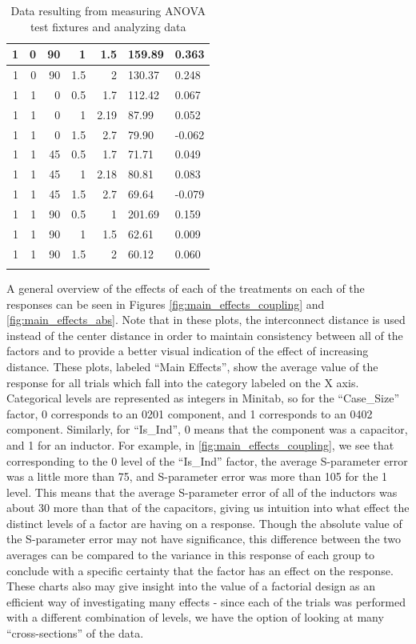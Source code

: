 \documentclass[12pt]{usfcoe}
\begin{document}
\begin{table}
\begin{tabular}{|r|r|r|r|r|l|l|}
        \hline
        1&0&90&1&1.5&159.89&0.363 \\
        \hline
        1&0&90&1.5&2&130.37&0.248 \\
        \hline
        1&1&0&0.5&1.7&112.42&0.067 \\
        \hline
        1&1&0&1&2.19&87.99&0.052 \\
        \hline
        1&1&0&1.5&2.7&79.90&-0.062 \\
        \hline
        1&1&45&0.5&1.7&71.71&0.049 \\
        \hline
        1&1&45&1&2.18&80.81&0.083 \\
        \hline
        1&1&45&1.5&2.7&69.64&-0.079 \\
        \hline
        1&1&90&0.5&1&201.69&0.159 \\
        \hline
        1&1&90&1&1.5&62.61&0.009 \\
        \hline
        1&1&90&1.5&2&60.12&0.060 \\
        \hline
        \label{tbl:anova_data}
        \caption{Data resulting from measuring ANOVA test fixtures and analyzing data}
        \end{tabular}
    \end{table}

    A general overview of the effects of each of the treatments on each of the responses can be seen in Figures \ref{fig:main_effects_coupling} and \ref{fig:main_effects_abs}. 
    Note that in these plots, the interconnect distance is used instead of the center distance in order to maintain consistency between all of the factors and to provide a better visual indication of the effect of increasing distance.
    These plots, labeled ``Main Effects'', show the average value of the response for all trials which fall into the category labeled on the X axis.
    Categorical levels are represented as integers in Minitab, so for the ``Case\_Size'' factor, 0 corresponds to an 0201 component, and 1 corresponds to an 0402 component. 
    Similarly, for ``Is\_Ind'', 0 means that the component was a capacitor, and 1 for an inductor.
    For example, in \ref{fig:main_effects_coupling}, we see that corresponding to the 0 level of the ``Is\_Ind'' factor, the average S-parameter error was a little more than 75, and S-parameter error was more than 105 for the 1 level. 
    This means that the average S-parameter error of all of the inductors was about 30 more than that of the capacitors, giving us intuition into what effect the distinct levels of a factor are having on a response. 
    Though the absolute value of the S-parameter error may not have significance, this difference between the two averages can be compared to the variance in this response of each group to conclude with a specific certainty that the factor has an effect on the response.
    These charts also may give insight into the value of a factorial design as an efficient way of investigating many effects - since each of the trials was performed with a different combination of levels, we have the option of looking at many ``cross-sections'' of the data. 
\end{document}
